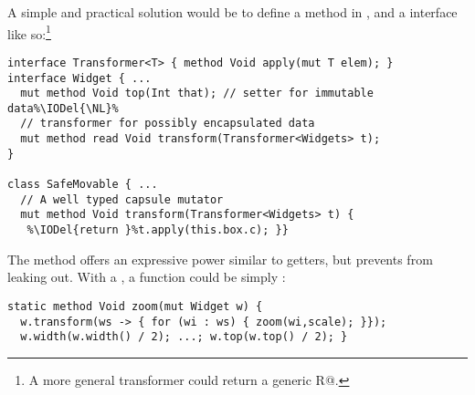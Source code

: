 A simple and practical solution would be to define a \Q@transform@ method in \Q@Widget@, and a \Q@Transformer@ interface 
like so:\footnote{A more general transformer could return a generic \Q@read R@.}
\begin{lstlisting}[escapechar=\%]
interface Transformer<T> { method Void apply(mut T elem); }
interface Widget { ...
  mut method Void top(Int that); // setter for immutable data%\IODel{\NL}%
  // transformer for possibly encapsulated data
  mut method read Void transform(Transformer<Widgets> t);
}

class SafeMovable { ...
  // A well typed capsule mutator
  mut method Void transform(Transformer<Widgets> t) {
   %\IODel{return }%t.apply(this.box.c); }}
\end{lstlisting}
The \Q@transform@ method offers an expressive power similar to \Q@mut@ getters, but prevents \Q@Widgets@ from leaking out.  With a \Q@Transformer@, a \Q@zoom@ function could be simply :
\begin{lstlisting}
static method Void zoom(mut Widget w) {
  w.transform(ws -> { for (wi : ws) { zoom(wi,scale); }});
  w.width(w.width() / 2); ...; w.top(w.top() / 2); }
\end{lstlisting}




